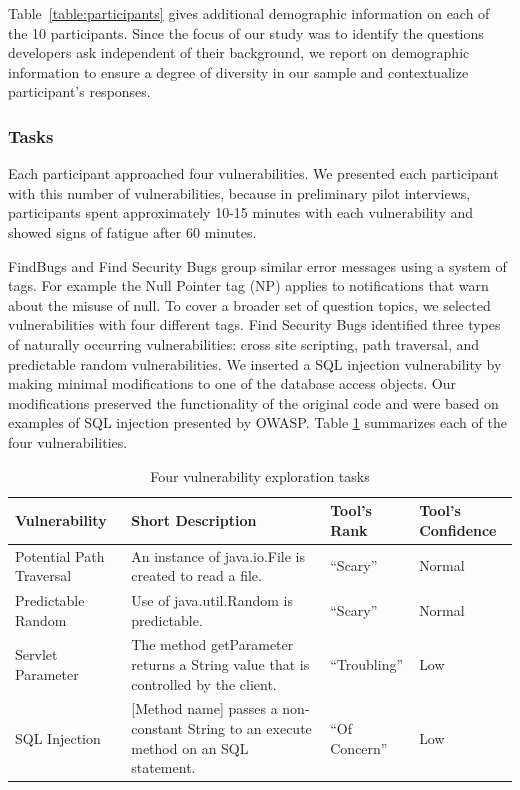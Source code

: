 \documentclass[conference]{IEEEtran}
\begin{document}
Table~\ref{table:participants} gives additional demographic information on each of the 10 participants. 
Since the focus of our study was to identify the questions developers ask independent of their background, we report on demographic information to ensure a degree of diversity in our sample and contextualize participant's responses.

\subsubsection{Tasks}
Each participant approached four vulnerabilities. 
We presented each participant with this number of vulnerabilities, because in preliminary pilot interviews, participants spent approximately 10-15 minutes with each vulnerability and showed signs of fatigue after 60 minutes.

FindBugs and Find Security Bugs group similar error messages using a system of tags. For example the Null Pointer tag (NP) applies to notifications that warn about the misuse of null. 
To cover a broader set of question topics, we selected vulnerabilities with four different tags.
Find Security Bugs identified three types of naturally occurring vulnerabilities: cross site scripting, path traversal, and predictable random vulnerabilities.
We inserted a SQL injection vulnerability by making minimal modifications to one of the database access objects.
Our modifications preserved the functionality of the original code and were based on examples of SQL injection presented by OWASP.
Table \ref{table:vulnerabilities} summarizes each of the four vulnerabilities. 

\begin{table} 
\centering
\caption{Four vulnerability exploration tasks}
\begin{tabular}{|l|l|l|l|}
\rowcolor{gray!50}
\hline
    Vulnerability				& Short Description													& Tool's Rank 						& Tool's Confidence\\
    \hline	
    Potential Path Traversal	& An instance of java.io.File is created to read a file.     			& ``Scary''							 	&  Normal\\
    \hline
    Predictable Random			& Use of java.util.Random is predictable. 								& ``Scary''								&  Normal\\
    \hline
    Servlet Parameter 			& The method getParameter returns a String value that is controlled by the client.			& ``Troubling''		&  Low\\
    \hline
    SQL Injection				& [Method name] passes a non-constant String to an execute method on an SQL statement.     	& ``Of Concern''		&  Low\\
    \hline
\end{tabular}
\label{table:vulnerabilities}
\end{table}
\end{document}
